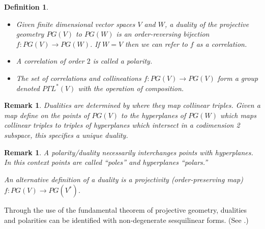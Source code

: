\documentclass[12pt]{article}
\newtheorem{defn}[thm]{Definition}
\newtheorem{remark}[thm]{Remark}
\begin{document}
\begin{defn}
\begin{itemize}
\item Given finite dimensional vector spaces $V$ and $W$, a \emph{duality} of the projective geometry $PG(V)$ to $PG(W)$ is an order-reversing bijection 
$f:PG(V)\rightarrow PG(W)$.  If $W=V$ then we can refer to $f$ as a correlation.

\item A correlation of order $2$ is called a \emph{polarity}.

\item The set of correlations and collineations $f:PG(V)\rightarrow PG(V)$ form a group denoted $P\Gamma L^*(V)$ with the operation of composition.
\end{itemize}
\end{defn}

\begin{remark}
Dualities are determined by where they map collinear triples.   Given a map
define on the points of $PG(V)$ to the hyperplanes of $PG(W)$ which maps collinear triples to triples of hyperplanes which intersect in a codimension 2 subspace, this specifies a unique duality.
\end{remark}

\begin{remark}
A polarity/duality necessarily interchanges points with hyperplanes.  In this context points are called ``poles'' and hyperplanes ``polars.''

An alternative definition of a duality is a projectivity (order-preserving map) $f:PG(V)\rightarrow PG(V^*)$.  
\end{remark}

Through the use of the fundamental theorem of projective geometry, dualities and polarities can be identified with non-degenerate sesquilinear forms.  (See .)

\end{document}
